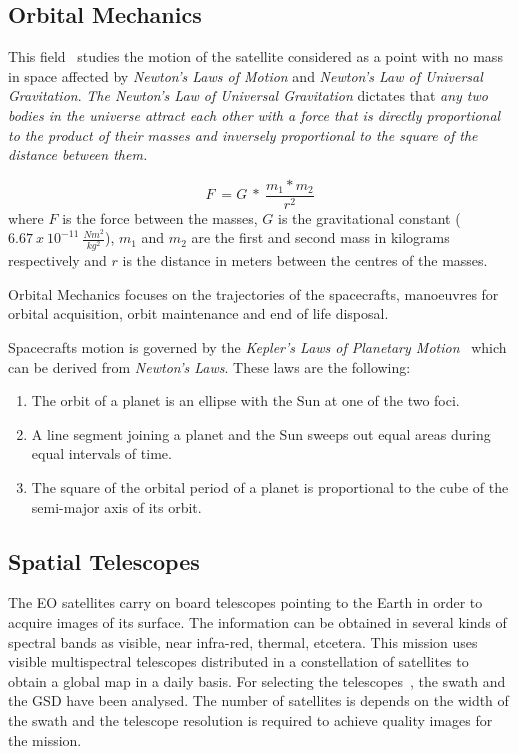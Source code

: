 \subsection{Orbital Mechanics}

This field~\cite{Braeunig2013} studies the motion of the satellite considered as a point with no
mass in space affected by \emph{Newton's Laws of Motion} and \emph{Newton's Law of
Universal Gravitation}.
\emph{The Newton's Law of Universal Gravitation} dictates that \emph{any two bodies in the
universe attract each other with a force that is directly proportional to the
product of their masses and inversely proportional to the square of the distance
between them.}

\begin{equation}
F~= G~*~{\frac {m_1*m_2}{r^2}}
\end{equation}
where $F$ is the force between the masses, $G$ is the gravitational constant
($6.67~x~10^{-11}~\frac{Nm^2}{kg^2}$), $m_1$ and $m_2$ are the first and second
mass in kilograms respectively
and $r$ is the distance in meters between the centres of the masses.

Orbital Mechanics focuses on the trajectories of the
spacecrafts, manoeuvres for orbital acquisition, orbit maintenance and end of life
disposal.

Spacecrafts motion  is governed by the \emph{Kepler's Laws of Planetary
  Motion}~\cite{Stern2014} which can be derived from \emph{Newton's Laws}. These laws are the following:
\begin{enumerate}
\item The orbit of a planet is an ellipse with the Sun at one of the two foci.
\item A line segment joining a planet and the Sun sweeps out equal areas during
  equal intervals of time.
\item The square of the orbital period of a planet is proportional to the cube
  of the semi-major axis of its orbit.
\end{enumerate}


\subsection{Spatial Telescopes }

The \ac{EO} satellites carry on board telescopes pointing to the Earth in order
to acquire images of its surface. The information can be obtained in several
kinds of spectral bands as visible, near infra-red, thermal, etcetera. This
mission uses visible multispectral telescopes distributed in a constellation of satellites
to obtain a global map in a daily basis. For selecting the telescopes~\cite{Ball2013}, the swath
and the \ac{GSD}
have been analysed. The number of satellites is depends on the width of the
swath and the telescope resolution is required to achieve quality
images for the mission.

